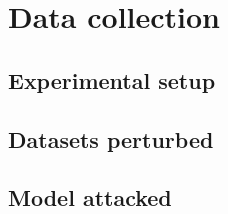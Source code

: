 \section{Data collection}\label{sec:data-collection}

\subsection{Experimental setup}\label{subsec:experimental-setup}


\subsection{Datasets perturbed}\label{subsec:datasets-perturbed}


\subsection{Model attacked}\label{subsec:model-attacked}

